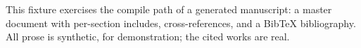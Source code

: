 This fixture exercises the compile path of a generated manuscript: a master document with
per-section includes, cross-references, and a BibTeX bibliography. All prose is synthetic,
for demonstration; the cited works are real.
